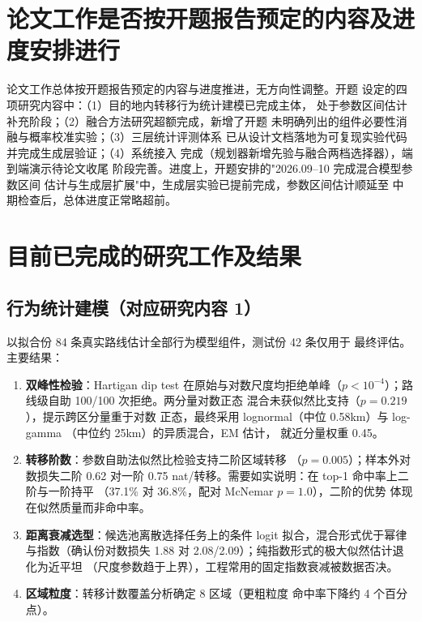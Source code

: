 
\section{论文工作是否按开题报告预定的内容及进度安排进行}

论文工作总体按开题报告预定的内容与进度推进，无方向性调整。开题
设定的四项研究内容中：（1）目的地内转移行为统计建模已完成主体，
处于参数区间估计补充阶段；（2）融合方法研究超额完成，新增了开题
未明确列出的组件必要性消融与概率校准实验；（3）三层统计评测体系
已从设计文档落地为可复现实验代码并完成生成层验证；（4）系统接入
完成（规划器新增先验与融合两档选择器），端到端演示待论文收尾
阶段完善。进度上，开题安排的"2026.09--10 完成混合模型参数区间
估计与生成层扩展"中，生成层实验已提前完成，参数区间估计顺延至
中期检查后，总体进度正常略超前。

\section{目前已完成的研究工作及结果}

\subsection{行为统计建模（对应研究内容 1）}

以拟合份 84 条真实路线估计全部行为模型组件，测试份 42 条仅用于
最终评估。主要结果：

\begin{enumerate}
  \item \textbf{双峰性检验}：Hartigan dip test\cite{hartigan1985dip}
        在原始与对数尺度均拒绝单峰（$p<10^{-4}$）；路线级自助
        100/100 次拒绝\cite{efron1993bootstrap}。两分量对数正态
        混合未获似然比支持（$p=0.219$），提示跨区分量重于对数
        正态，最终采用 lognormal（中位 0.58km）与 log-gamma
        （中位约 25km）的异质混合，EM 估计\cite{dempster1977em}，
        就近分量权重 0.45。
  \item \textbf{转移阶数}：参数自助法似然比检验支持二阶区域转移
        （$p=0.005$）；样本外对数损失二阶 0.62 对一阶 0.75
        nat/转移。需要如实说明：在 top-1 命中率上二阶与一阶持平
        （37.1\% 对 36.8\%，配对 McNemar $p=1.0$），二阶的优势
        体现在似然质量而非命中率。
  \item \textbf{距离衰减选型}：候选池离散选择任务上的条件 logit
        拟合，混合形式优于幂律与指数（确认份对数损失 1.88 对
        2.08/2.09）；纯指数形式的极大似然估计退化为近平坦
        （尺度参数趋于上界），工程常用的固定指数衰减被数据否决。
  \item \textbf{区域粒度}：转移计数覆盖分析确定 8 区域（更粗粒度
        命中率下降约 4 个百分点）。
\end{enumerate}

